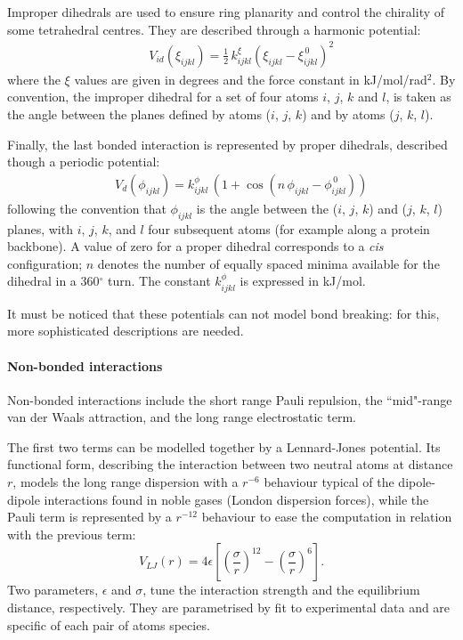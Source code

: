 Improper dihedrals are used to ensure ring planarity and control the chirality of some tetrahedral centres. They are described through a harmonic potential:
\begin{eqnarray}
&& V_{id} (\xi_{ijkl}) = \frac{1}{2}\,k_{ijkl}^\xi \left( \xi_{ijkl} - \xi_{ijkl}^{\, 0} \right)^2
\end{eqnarray}
where the $\xi$ values are given in degrees and the force constant in kJ/mol/rad$^2$. By convention, the improper dihedral for a set of four atoms $i$, $j$, $k$ and $l$, is taken as the angle between the planes defined by atoms ($i$, $j$, $k$) and by atoms ($j$, $k$, $l$).

Finally, the last bonded interaction is represented by proper dihedrals, described though a periodic potential:
\begin{eqnarray}
&& V_d(\phi_{ijkl}) = k_{ijkl}^\phi\,\left( 1 + \cos\left( n \, \phi_{ijkl} - \phi_{ijkl}^{\, 0} \right) \right)
\end{eqnarray}
following the convention that $\phi_{ijkl}$ is the angle between the ($i$, $j$, $k$) and ($j$, $k$, $l$) planes, with $i$, $j$, $k$, and $l$ four subsequent atoms (for example along a protein backbone). A value of zero for a proper dihedral corresponds to a \textit{cis} configuration; $n$ denotes the number of equally spaced minima available for the dihedral in a 360$^\circ$ turn. The constant $k_{ijkl}^\phi$ is expressed in kJ/mol.

It must be noticed that these potentials can not model bond breaking: for this, more sophisticated descriptions are needed.


\paragraph{Non-bonded interactions}
Non-bonded interactions include the short range Pauli repulsion, the ``mid"-range van der Waals attraction, and the long range electrostatic term.

The first two terms can be modelled together by a Lennard-Jones potential. Its functional form, describing the interaction between two neutral atoms at distance $r$, models the long range dispersion with a $r^{-6}$ behaviour typical of the dipole-dipole interactions found in noble gases (London dispersion forces), while the Pauli term is represented by a $r^{-12}$ behaviour to ease the computation in relation with the previous term:
\begin{equation}
V_{LJ}(r) = 4 \epsilon \left[ \left( \frac{\sigma}{r} \right)^{12} - \left( \frac{\sigma}{r} \right)^6 \right].
\end{equation}
Two parameters, $\epsilon$ and $\sigma$, tune the interaction strength and the equilibrium distance, respectively. They are parametrised by fit to experimental data and are specific of each pair of atoms species.


